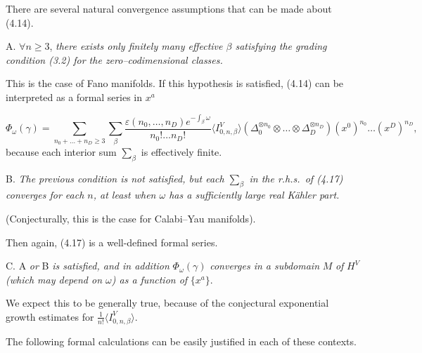 \documentclass[reqno]{amsart}
\theoremstyle{definition}
\begin{document}
\smallskip

There are several natural convergence assumptions that can be made
about (4.14).

\medskip

A. $\forall n\ge 3$, {\it there exists only finitely many effective
  $\beta$ satisfying the grading condition (3.2) for the
zero--codimensional classes.}

\smallskip

This is the case of Fano manifolds.
If this hypothesis is satisfied,
(4.14) can be interpreted as a formal series in $x^a$

\begin{equation*}
  \Phi_{\omega}(\gamma )=
  \sum_{n_0+\dots +n_D\ge 3}\sum_{\beta}
  \frac{\varepsilon (n_0,\dots ,n_D)e^{-\int_{\beta}\omega} }
  {n_0!\dots n_D! }
  \langle I^V_{0,n,\beta}\rangle
  (\Delta_0^{\otimes n_0}\otimes \dots\otimes\Delta_D^{\otimes n_D})
  (x^0)^{n_0}\dots (x^D)^{n_D},
  \tag{4.17}
\end{equation*}
because each interior sum $\sum_{\beta}$ is effectively finite.

\medskip

B. {\it The previous condition is not satisfied, but each
  $\sum_{\beta}$ in the r.h.s.~of (4.17) converges for each $n$,
  at least when $\omega$ has a sufficiently large real
K\"ahler part.}

\smallskip

(Conjecturally, this is the case for Calabi--Yau manifolds).

\smallskip

Then again, (4.17) is a well-defined formal series.

\medskip

C. A {\it or} B {\it is satisfied, and in addition} $\Phi_{\omega}(\gamma )$
{\it converges in a subdomain} $M$ {\it of} $H^V$ {\it (which may
depend on $\omega$) as a function of} $\{x^a\}$.

\smallskip

We expect this to be generally true, because of the conjectural
exponential growth estimates for $\frac{1}{n!}\langle I^V_{0,n,\beta}\rangle $.

\smallskip

The following formal calculations can be easily justified in each of
these contexts.

\medskip

\end{document}
